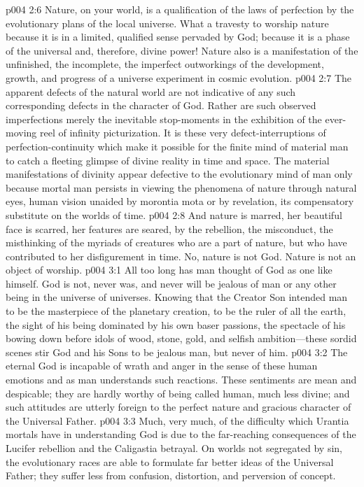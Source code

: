 \vs p004 2:6 Nature, on your world, is a qualification of the laws of perfection by the evolutionary plans of the local universe. What a travesty to worship nature because it is in a limited, qualified sense pervaded by God; because it is a phase of the universal and, therefore, divine power! Nature also is a manifestation of the unfinished, the incomplete, the imperfect outworkings of the development, growth, and progress of a universe experiment in cosmic evolution.
\vs p004 2:7 The apparent defects of the natural world are not indicative of any such corresponding defects in the character of God. Rather are such observed imperfections merely the inevitable stop\hyp{}moments in the exhibition of the ever\hyp{}moving reel of infinity picturization. It is these very defect\hyp{}interruptions of perfection\hyp{}continuity which make it possible for the finite mind of material man to catch a fleeting glimpse of divine reality in time and space. The material manifestations of divinity appear defective to the evolutionary mind of man only because mortal man persists in viewing the phenomena of nature through natural eyes, human vision unaided by morontia mota or by revelation, its compensatory substitute on the worlds of time.
\vs p004 2:8 And nature is marred, her beautiful face is scarred, her features are seared, by the rebellion, the misconduct, the misthinking of the myriads of creatures who are a part of nature, but who have contributed to her disfigurement in time. No, nature is not God. Nature is not an object of worship.\plusone
{}
\vs p004 3:1 All too long has man thought of God as one like himself. God is not, never was, and never will be jealous of man or any other being in the universe of universes. Knowing that the Creator Son intended man to be the masterpiece of the planetary creation, to be the ruler of all the earth, the sight of his being dominated by his own baser passions, the spectacle of his bowing down before idols of wood, stone, gold, and selfish ambition---these sordid scenes stir God and his Sons to be jealous  man, but never of him.
\vs p004 3:2 The eternal God is incapable of wrath and anger in the sense of these human emotions and as man understands such reactions. These sentiments are mean and despicable; they are hardly worthy of being called human, much less divine; and such attitudes are utterly foreign to the perfect nature and gracious character of the Universal Father.
\pc \vs p004 3:3 Much, very much, of the difficulty which Urantia mortals have in understanding God is due to the far\hyp{}reaching consequences of the Lucifer rebellion and the Caligastia betrayal. On worlds not segregated by sin, the evolutionary races are able to formulate far better ideas of the Universal Father; they suffer less from confusion, distortion, and perversion of concept.
